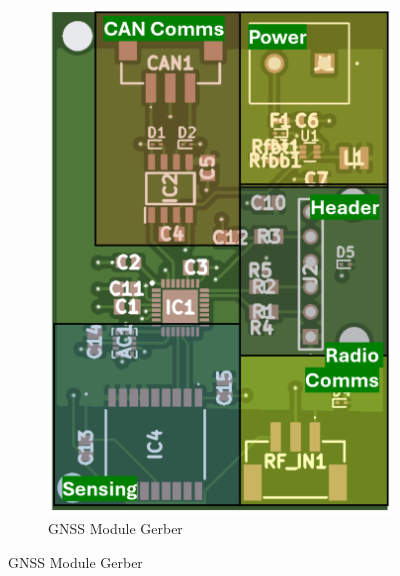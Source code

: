 \begin{figure}[htbp]
\begin{subfigure}[b]{0.48\textwidth}
    \includegraphics[width=\textwidth]{figs/Thomas/Custom Hardware/GPS gerber.png}
    \caption{GNSS Module Gerber}
    \label{fig:gnss_gerber}
  \end{subfigure}


\end{figure}
